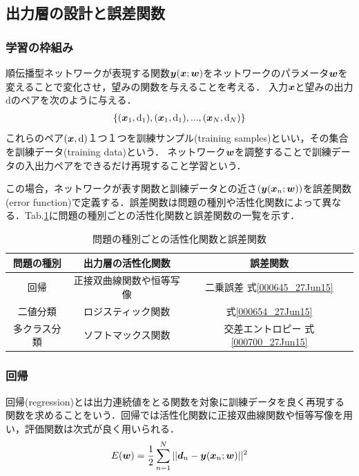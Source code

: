 \documentclass[a4paper,10pt]{jsarticle}
\def\vec#1{\mbox{\boldmath$#1$}}
\begin{document}
\subsection{出力層の設計と誤差関数}
\subsubsection{学習の枠組み}
順伝播型ネットワークが表現する関数$\vec{y}(\vec{x};\vec{w})$をネットワークのパラメータ$\vec{w}$を変えることで変化させ，望みの関数を与えることを考える．
入力$\vec{x}$と望みの出力$\mathrm{d}$のペアを次のように与える．
\begin{eqnarray}
 \{(\vec{x}_{1},\mathrm{d}_{1}),(\vec{x}_{1},\mathrm{d}_{1}),...,(\vec{x}_{N},\mathrm{d}_{N})\}
\end{eqnarray}
これらのペア$(\vec{x},\mathrm{d})$１つ１つを訓練サンプル(training samples)といい，その集合を訓練データ(training data)という．
ネットワーク$\vec{w}$を調整することで訓練データの入出力ペアをできるだけ再現すること学習という．

この場合，ネットワークが表す関数と訓練データとの近さ$(\vec{y}(\vec{x}_{n};\vec{w}))$を誤差関数(error function)で定義する．誤差関数は問題の種別や活性化関数によって異なる．Tab.\ref{000718_27Jun15}に問題の種別ごとの活性化関数と誤差関数の一覧を示す．

\begin{table}[htb]
\centering
\caption{問題の種別ごとの活性化関数と誤差関数}
\label{000718_27Jun15}
\begin{tabular}[bt]{|c|c|c|}\hline
 問題の種別& 出力層の活性化関数&誤差関数 \\ \hline \hline
 回帰&正接双曲線関数や恒等写像 & 二乗誤差 式\eqref{000645_27Jun15}\\
 二値分類& ロジスティック関数& 式\eqref{000654_27Jun15}\\ 
 多クラス分類& ソフトマックス関数& 交差エントロピー 式\eqref{000700_27Jun15}\\ \hline
\end{tabular}
\end{table}

\subsubsection{回帰}
回帰(regression)とは出力連続値をとる関数を対象に訓練データを良く再現する関数を求めることをいう．回帰では活性化関数に正接双曲線関数や恒等写像を用い，評価関数は次式が良く用いられる．
\begin{eqnarray}
 E(\vec{w}) = \displaystyle{\frac{1}{2}}\sum^{N}_{n=1}||\vec{d}_{n}-\vec{y}(\vec{x}_{n};\vec{w})||^{2}\label{000645_27Jun15}
\end{eqnarray}
\end{document}

